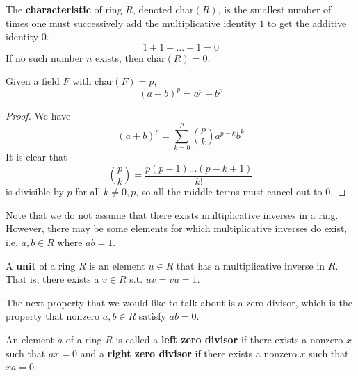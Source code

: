   \begin{definition}
    The \textbf{characteristic} of ring $R$, denoted char$(R)$, is the smallest number of times one must successively add the multiplicative identity $1$ to get the additive identity $0$. 
    \begin{equation}
      1 + 1 + ... + 1 = 0 
    \end{equation}
    If no such number $n$ exists, then char$(R) = 0$. 
  \end{definition}

  \begin{theorem}
    Given a field $F$ with char$(F) = p$, 
    \begin{equation}
      (a + b)^p = a^p + b^p
    \end{equation}
  \end{theorem}
  \begin{proof}
    We have 
    \begin{equation}
      (a + b)^p = \sum_{k = 0}^p \binom{p}{k} a^{p-k} b^{k}
    \end{equation}
    It is clear that 
    \begin{equation}
      \binom{p}{k} = \frac{p (p-1) ... (p - k+1)}{k!}
    \end{equation}
    is divisible by $p$ for all $k \neq 0, p$, so all the middle terms must cancel out to $0$. 
  \end{proof}


  Note that we do not assume that there exists multiplicative inverses in a ring. However, there may be some elements for which multiplicative inverses do exist, i.e. $a, b \in R$ where $ab = 1$.  

  \begin{definition}[Unit]
    A \textbf{unit} of a ring $R$ is an element $u \in R$ that has a multiplicative inverse in $R$. That is, there exists a $v \in R$ s.t. $uv = vu = 1$. 
  \end{definition}

  The next property that we would like to talk about is a zero divisor, which is the property that nonzero $a, b \in R$ satisfy $ab = 0$. 

  \begin{definition}
    An element $a$ of a ring $R$ is called a \textbf{left zero divisor} if there exists a nonzero $x$ such that $a x = 0$ and a \textbf{right zero divisor} if there exists a nonzero $x$ such that $x a = 0$. 
  \end{definition} 

